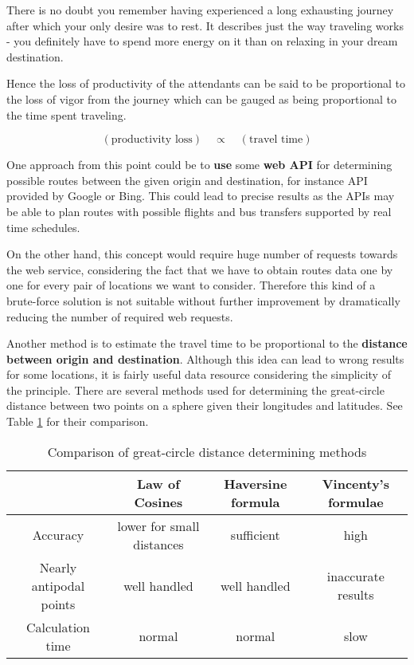 There is no doubt you remember having experienced a long exhausting journey after which your only desire was to rest. It describes just the way traveling works - you definitely have to spend more energy on it than on relaxing in your dream destination.

Hence the loss of productivity of the attendants can be said to be proportional to the loss of vigor from the journey which can be gauged as being proportional to the time spent traveling.

$$(\text{productivity loss})\quad \propto\quad (\text{travel time})$$

One approach from this point could be to \textbf{use} some \textbf{web API} for determining possible routes between the given origin and destination, for instance API provided by Google or Bing. This could lead to precise results as the APIs may be able to plan routes with possible flights and bus transfers supported by real time schedules.

On the other hand, this concept would require huge number of requests towards the web service, considering the fact that we have to obtain routes data one by one for every pair of locations we want to consider. Therefore this kind of a brute-force solution is not suitable without further improvement by dramatically reducing the number of required web requests.

Another method is to estimate the travel time to be proportional to the \textbf{distance between origin and destination}. Although this idea can lead to wrong results for some locations, it is fairly useful data resource considering the simplicity of the principle. There are several methods used for determining the great-circle distance between two points on a sphere given their longitudes and latitudes. See Table \ref{table:distance-methods} for their comparison.

\begin{table}[!ht]
\centering \centering
\begin{tabular}{|c|c|c|c|}
\cline{2-4}
\multicolumn{1}{c|}{} & \textbf{Law of Cosines} & \textbf{Haversine formula} & \textbf{Vincenty's formulae} \\
\hline
Accuracy & lower for small distances & sufficient & high \\
\hline
Nearly antipodal points & well handled & well handled & inaccurate results \\
\hline
Calculation time & normal & normal & slow \\
\hline
\end{tabular}
\caption{Comparison of great-circle distance determining methods}
\label{table:distance-methods}
\end{table}

